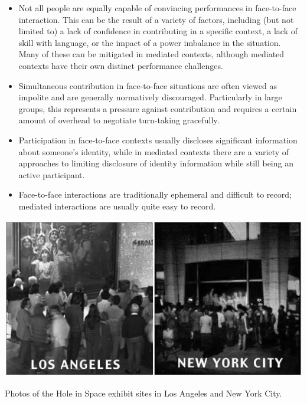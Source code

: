 \documentclass{tufte-handout}
\begin{document}
\begin{itemize}
\item Not all people are equally capable of convincing performances in face-to-face interaction. This can be the result of a variety of factors, including (but not limited to) a lack of confidence in contributing in a specific context, a lack of skill with language, or the impact of a power imbalance in the situation. Many of these can be mitigated in mediated contexts\citep{Siegel:1986ve}, although mediated contexts have their own distinct performance challenges.
\item Simultaneous contribution in face-to-face situations are often viewed as impolite and are generally normatively discouraged. Particularly in large groups, this represents a pressure against contribution and requires a certain amount of overhead to negotiate turn-taking gracefully.
\item Participation in face-to-face contexts usually discloses significant information about someone's identity, while in mediated contexts there are a variety of approaches to limiting disclosure of identity information while still being an active participant.
\item Face-to-face interactions are traditionally ephemeral and difficult to record; mediated interactions are usually quite easy to record. 
\end{itemize}




\begin{marginfigure}
	\includegraphics{figures/hole_in_space.jpg}
	\caption{Photos of the Hole in Space exhibit sites in Los Angeles and New York City.}
	\label{fig:hole-in-space}
\end{marginfigure}
\end{document}
